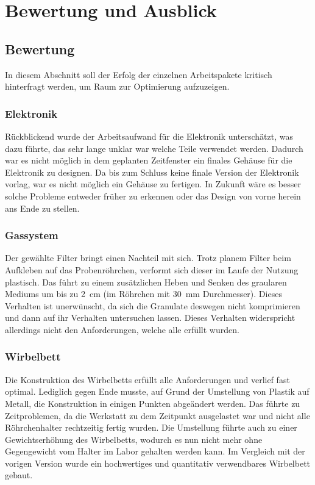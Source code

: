 \chapter{Bewertung und Ausblick}


\section{Bewertung}

In diesem Abschnitt soll der Erfolg der einzelnen Arbeitspakete kritisch hinterfragt werden, um Raum zur Optimierung aufzuzeigen. 

\subsection{Elektronik}

Rückblickend wurde der Arbeitsaufwand für die Elektronik unterschätzt, was dazu führte, das sehr lange unklar war welche Teile verwendet werden. Dadurch war es nicht möglich in dem geplanten Zeitfenster ein finales Gehäuse für die Elektronik zu designen. Da bis zum Schluss keine finale Version der Elektronik vorlag, war es nicht möglich ein Gehäuse zu fertigen. In Zukunft wäre es besser solche Probleme entweder früher zu erkennen oder das Design von vorne herein ans Ende zu stellen. 

\subsection{Gassystem}

Der gewählte Filter bringt einen Nachteil mit sich. Trotz planem Filter beim Aufkleben auf das Probenröhrchen, verformt sich dieser im Laufe der Nutzung plastisch. Das führt zu einem zusätzlichen Heben und Senken des graularen Mediums um bis zu \SI{2}{cm} (im Röhrchen mit \SI{30}{mm}  Durchmesser). Dieses Verhalten ist unerwünscht, da sich die Granulate deswegen nicht komprimieren und dann auf ihr Verhalten untersuchen lassen. Dieses Verhalten widerspricht allerdings nicht den Anforderungen, welche alle erfüllt wurden.

\subsection{Wirbelbett}

Die Konstruktion des Wirbelbetts erfüllt alle Anforderungen und verlief fast optimal. Lediglich gegen Ende musste, auf Grund der Umstellung von Plastik auf Metall, die Konstruktion in einigen Punkten abgeändert werden. Das führte zu Zeitproblemen, da die Werkstatt zu dem Zeitpunkt ausgelastet war und nicht alle Röhrchenhalter rechtzeitig fertig wurden. Die Umstellung führte auch zu einer Gewichtserhöhung des Wirbelbetts, wodurch es nun nicht mehr ohne Gegengewicht vom Halter im Labor gehalten werden kann.
Im Vergleich mit der vorigen Version wurde ein hochwertiges und quantitativ verwendbares Wirbelbett gebaut.

